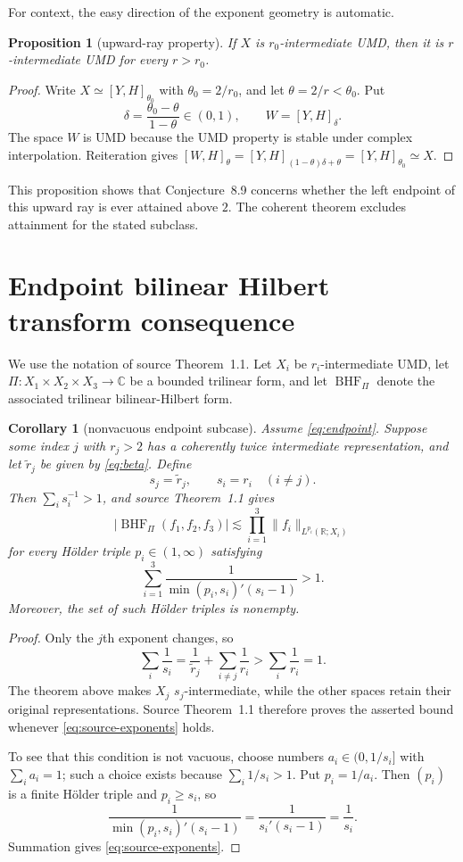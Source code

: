 \documentclass[11pt]{article}
\newtheorem{proposition}{Proposition}
\newtheorem{corollary}{Corollary}
\theoremstyle{definition}
\newcommand{\BHF}{\operatorname{BHF}}
\begin{document}
For context, the easy direction of the exponent geometry is automatic.

\begin{proposition}[upward-ray property]
If $X$ is $r_0$-intermediate UMD, then it is $r$-intermediate UMD for every
$r>r_0$.
\end{proposition}

\begin{proof}
Write $X\simeq[Y,H]_{\theta_0}$ with $\theta_0=2/r_0$, and let
$\theta=2/r<\theta_0$.  Put
\[
  \delta=\frac{\theta_0-\theta}{1-\theta}\in(0,1),
  \qquad W=[Y,H]_{\delta}.
\]
The space $W$ is UMD because the UMD property is stable under complex
interpolation.  Reiteration gives
$[W,H]_{\theta}=[Y,H]_{(1-\theta)\delta+\theta}
=[Y,H]_{\theta_0}\simeq X$.
\end{proof}

This proposition shows that Conjecture~8.9 concerns whether the left endpoint
of this upward ray is ever attained above $2$.  The coherent theorem excludes
attainment for the stated subclass.

\section{Endpoint bilinear Hilbert transform consequence}

We use the notation of source Theorem~1.1.  Let $X_i$ be
$r_i$-intermediate UMD, let
$\Pi:X_1\times X_2\times X_3\to\mathbb C$ be a bounded trilinear form, and
let $\BHF_{\Pi}$ denote the associated trilinear bilinear-Hilbert form.

\begin{corollary}[nonvacuous endpoint subcase]
Assume \eqref{eq:endpoint}.  Suppose some index $j$ with $r_j>2$ has a
coherently twice intermediate representation, and let $\widetilde r_j$ be
given by \eqref{eq:beta}.  Define
\[
  s_j=\widetilde r_j,
  \qquad s_i=r_i\quad(i\ne j).
\]
Then $\sum_i s_i^{-1}>1$, and source Theorem~1.1 gives
\[
 |\BHF_{\Pi}(f_1,f_2,f_3)|
 \lesssim \prod_{i=1}^{3}\|f_i\|_{L^{p_i}(\mathbb R;X_i)}
\]
for every H\"older triple $p_i\in(1,\infty)$ satisfying
\begin{equation}\label{eq:source-exponents}
 \sum_{i=1}^{3}
 \frac{1}{\min(p_i,s_i)'(s_i-1)}>1.
\end{equation}
Moreover, the set of such H\"older triples is nonempty.
\end{corollary}

\begin{proof}
Only the $j$th exponent changes, so
\[
 \sum_i\frac1{s_i}
 =\frac1{\widetilde r_j}+\sum_{i\ne j}\frac1{r_i}
 >\sum_i\frac1{r_i}=1.
\]
The theorem above makes $X_j$ $s_j$-intermediate, while the other spaces
retain their original representations.  Source Theorem~1.1 therefore proves
the asserted bound whenever \eqref{eq:source-exponents} holds.

To see that this condition is not vacuous, choose numbers
$a_i\in(0,1/s_i]$ with $\sum_i a_i=1$; such a choice exists because
$\sum_i1/s_i>1$.  Put $p_i=1/a_i$.  Then $(p_i)$ is a finite H\"older
triple and $p_i\ge s_i$, so
\[
 \frac{1}{\min(p_i,s_i)'(s_i-1)}
 =\frac{1}{s_i'(s_i-1)}=\frac1{s_i}.
\]
Summation gives \eqref{eq:source-exponents}.
\end{proof}
\end{document}
